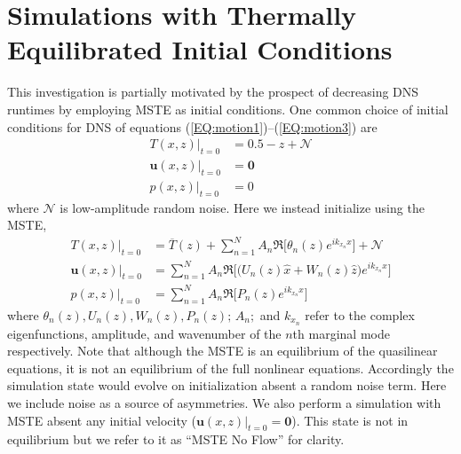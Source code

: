 \documentclass[reprint,amsmath,amssymb,aps,nofootinbib]{revtex4-1}
\renewcommand{\vec}[1]{\boldsymbol{#1}}
\newcommand{\eqss}[2]{(\ref{#1})--(\ref{#2})}
\begin{document}
\section{Simulations with Thermally Equilibrated Initial Conditions}\label{sec:sims}
This investigation is partially motivated by the prospect of decreasing DNS runtimes by employing MSTE as initial conditions. 
One common choice of initial conditions for DNS of equations \eqss{EQ:motion1}{EQ:motion3} are
\begin{align}
    T(x, z)\big|_{t=0} &= 0.5 - z + \mathcal{N} \nonumber \\
    \vec{u}(x, z)\big|_{t=0} &= \vec{0} \nonumber \\
    p(x, z)\big|_{t=0} &= 0 \label{EQ:linear_ic}
\end{align}
where $\mathcal{N}$ is low-amplitude random noise.
Here we instead initialize using the MSTE,
\begin{align}
    T(x, z)\big|_{t=0} &= \overline{T}(z) + \sum_{n=1}^N  A_n \Re \Big[ \theta_n(z) e^{ik_{x_n}x} \Big] + \mathcal{N} \nonumber \\
    \vec{u}(x, z)\big|_{t=0} &= \sum_{n=1}^N A_n \Re \Big[\Big( U_n (z) \hat{x} + W_n(z) \hat{z} \Big) e^{ik_{x_n}x} \Big] \nonumber\\
    p(x, z)\big|_{t=0} &= \sum_{n=1}^N A_n \Re \Big[P_n (z) e^{ik_{x_n}x}\Big] \label{EQ:mste_ic}
\end{align}
where $\theta_n(z), U_n(z), W_n(z), P_n(z); \, A_n; $ and $k_{x_n}$ refer to the complex eigenfunctions, amplitude, and wavenumber of the $n$th marginal mode respectively. 
Note that although the MSTE is an equilibrium of the quasilinear equations, it is not an equilibrium of the full nonlinear equations.
Accordingly the simulation state would evolve on initialization absent a random noise term.
Here we include noise as a source of asymmetries. 
We also perform a simulation with MSTE absent any initial velocity ($\vec{u}(x, z)|_{t=0} = \vec{0}$). 
This state is not in equilibrium but we refer to it as ``MSTE No Flow'' for clarity.
\end{document}
